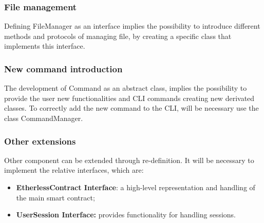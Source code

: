 \subsubsection{File management}
Defining FileManager as an interface implies the possibility to introduce different methods and protocols of managing file, by creating a specific class that implements this interface. 

\subsubsection{New command introduction}
The development of Command as an abstract class, implies the possibility to provide the user new functionalities and CLI commands creating new derivated classes. To correctly add the new command to the CLI, will be necessary use the class CommandManager.

\subsubsection{Other extensions}
Other component can be extended through re-definition. It will be necessary to implement the relative interfaces, which are:
\begin{itemize}
	\item \textbf{EtherlessContract Interface}: a high-level representation and handling of the main smart contract;
	\item \textbf{UserSession Interface:} provides functionality for handling sessions.
\end{itemize}